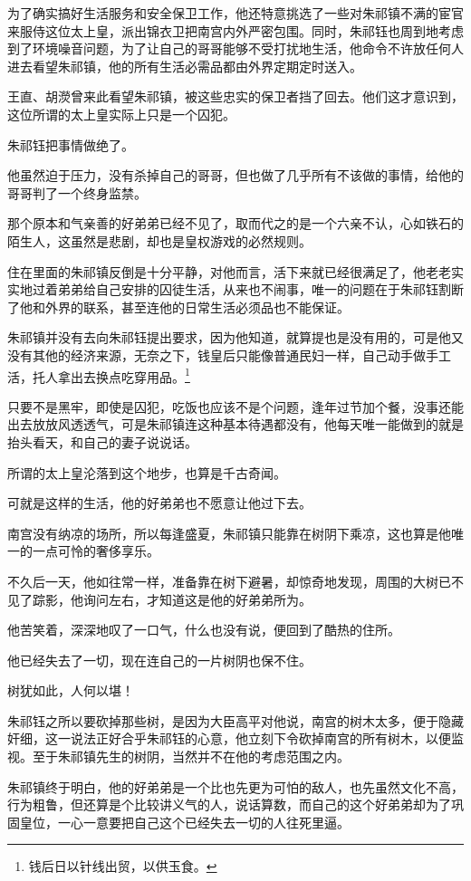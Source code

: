 \begin{multicols}{\theparacolNo}
为了确实搞好生活服务和安全保卫工作，他还特意挑选了一些对朱祁镇不满的宦官来服侍这位太上皇，派出锦衣卫把南宫内外严密包围。同时，朱祁钰也周到地考虑到了环境噪音问题，为了让自己的哥哥能够不受打扰地生活，他命令不许放任何人进去看望朱祁镇，他的所有生活必需品都由外界定期定时送入。

王直、胡濙曾来此看望朱祁镇，被这些忠实的保卫者挡了回去。他们这才意识到，这位所谓的太上皇实际上只是一个囚犯。

朱祁钰把事情做绝了。

他虽然迫于压力，没有杀掉自己的哥哥，但也做了几乎所有不该做的事情，给他的哥哥判了一个终身监禁。

那个原本和气亲善的好弟弟已经不见了，取而代之的是一个六亲不认，心如铁石的陌生人，这虽然是悲剧，却也是皇权游戏的必然规则。

住在里面的朱祁镇反倒是十分平静，对他而言，活下来就已经很满足了，他老老实实地过着弟弟给自己安排的囚徒生活，从来也不闹事，唯一的问题在于朱祁钰割断了他和外界的联系，甚至连他的日常生活必须品也不能保证。

朱祁镇并没有去向朱祁钰提出要求，因为他知道，就算提也是没有用的，可是他又没有其他的经济来源，无奈之下，钱皇后只能像普通民妇一样，自己动手做手工活，托人拿出去换点吃穿用品。\footnote{钱后日以针线出贸，以供玉食。}

只要不是黑牢，即使是囚犯，吃饭也应该不是个问题，逢年过节加个餐，没事还能出去放放风透透气，可是朱祁镇连这种基本待遇都没有，他每天唯一能做到的就是抬头看天，和自己的妻子说说话。

所谓的太上皇沦落到这个地步，也算是千古奇闻。

可就是这样的生活，他的好弟弟也不愿意让他过下去。

南宫没有纳凉的场所，所以每逢盛夏，朱祁镇只能靠在树阴下乘凉，这也算是他唯一的一点可怜的奢侈享乐。

不久后一天，他如往常一样，准备靠在树下避暑，却惊奇地发现，周围的大树已不见了踪影，他询问左右，才知道这是他的好弟弟所为。

他苦笑着，深深地叹了一口气，什么也没有说，便回到了酷热的住所。

他已经失去了一切，现在连自己的一片树阴也保不住。

树犹如此，人何以堪！

朱祁钰之所以要砍掉那些树，是因为大臣高平对他说，南宫的树木太多，便于隐藏奸细，这一说法正好合乎朱祁钰的心意，他立刻下令砍掉南宫的所有树木，以便监视。至于朱祁镇先生的树阴，当然并不在他的考虑范围之内。

朱祁镇终于明白，他的好弟弟是一个比也先更为可怕的敌人，也先虽然文化不高，行为粗鲁，但还算是个比较讲义气的人，说话算数，而自己的这个好弟弟却为了巩固皇位，一心一意要把自己这个已经失去一切的人往死里逼。


\end{multicols}
